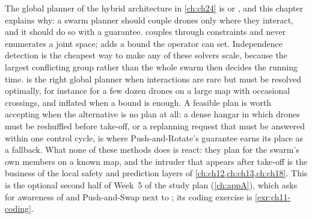 \begin{dronebox}
%
The global planner of the hybrid architecture in \cref{ch:ch24} is \cbs or
\ecbs, and this chapter explains why: a swarm planner should couple drones
only where they interact, and it should do so with a guarantee. \cbs
couples through constraints and never enumerates a joint space; \ecbs adds
a bound the operator can set. Independence detection is the cheapest way to
make any of these solvers scale, because the largest conflicting group
rather than the whole swarm then decides the running time. \mstar is the
right global planner when interactions are rare
but must be resolved optimally, for instance for a few dozen drones on a
large map with occasional crossings, and inflated \mstar when a bound is
enough. A feasible plan is worth accepting when the alternative is no plan
at all: a dense hangar in which drones must be reshuffled before take-off,
or a replanning request that must be answered within one control cycle, is
where Push-and-Rotate's guarantee earns its place as a fallback. What none
of these methods does is react: they plan for the swarm's own members on a
known map, and the intruder that appears after take-off is the business of
the local safety and prediction layers of \cref{ch:ch12,ch:ch13,ch:ch18}.
This is the optional second half of Week~5 of the study plan
(\cref{ch:appA}), which asks for awareness of \mstar and Push-and-Swap next
to \ecbs; its coding exercise is \cref{exr:ch11-coding}.
\end{dronebox}


